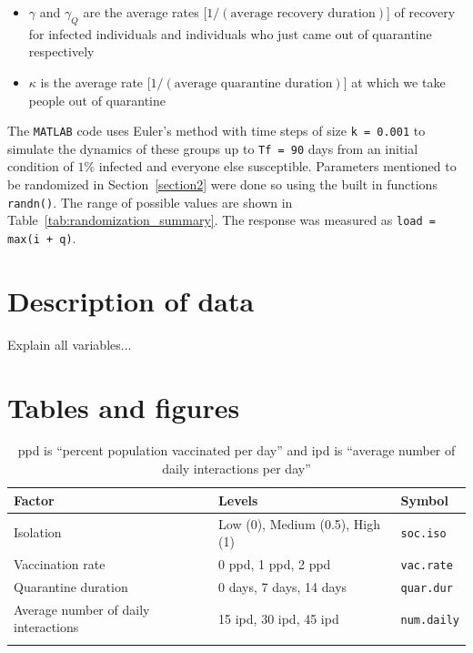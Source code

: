 \documentclass[12pt,a4paper]{article}
\begin{document}
\begin{appendices}
\begin{itemize}
	\vspace*{-3mm}
	\item $\gamma$ and $\gamma_Q$ are the average rates [$1/(\text{average recovery duration})$] of recovery for infected individuals and individuals who just came out of quarantine respectively
	\vspace*{-3mm}
	\item $\kappa$ is the average rate [$1/(\text{average quarantine duration})$] at which we take people out of quarantine
\end{itemize}
The \verb`MATLAB` code uses Euler's method with time steps of size \verb`k = 0.001` to simulate the dynamics of these groups up to \verb`Tf = 90` days from an initial condition of $1\%$ infected and everyone else susceptible. Parameters mentioned to be randomized in Section~\ref{section2} were done so using the built in functions \verb`randn()`. The range of possible values are shown in Table~\ref{tab:randomization_summary}. The response was measured as \verb`load = max(i + q)`.

\section{Description of data}\label{appendixB}
Explain all variables...

\section{Tables and figures}\label{appendixC}

\begin{table}[H]
    \centering
    \begin{tabular}{l l l}\hline
         Factor &  Levels & Symbol \\ \hline\hline
         Isolation & Low (0), Medium (0.5), High (1) & \verb`soc.iso` \\ \hline
         Vaccination rate & 0 \si{ppd}, 1 \si{ppd}, 2 \si{ppd} & \verb`vac.rate` \\ \hline
         Quarantine duration & 0 days, 7 days, 14 days & \verb`quar.dur`\\ \hline
         Average number of daily interactions & 15 \si{ipd}, 30 \si{ipd}, 45 \si{ipd} & \verb`num.daily` \\ \hline \\
    \end{tabular}
    \caption{\si{ppd} is ``percent population vaccinated per day'' and \si{ipd} is ``average number of daily interactions per day''}
    \label{tab:factor_summary}
\end{table}


\end{appendices}
\end{document}
